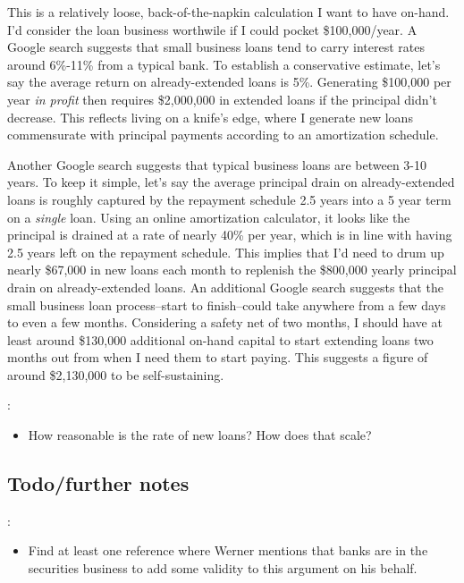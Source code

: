This is a relatively loose, back-of-the-napkin calculation I want to have on-hand.  I'd consider the loan business worthwile if I could pocket \$100,000/year.  A Google search suggests that small business loans tend to carry interest rates around 6\%-11\% from a typical bank.  To establish a conservative estimate, let's say the average return on already-extended loans is 5\%.  Generating \$100,000 per year {\it in profit} then requires \$2,000,000 in extended loans if the principal didn't decrease.  This reflects living on a knife's edge, where I generate new loans commensurate with principal payments according to an amortization schedule.

Another Google search suggests that typical business loans are between 3-10 years.  To keep it simple, let's say the average principal drain on already-extended loans is roughly captured by the repayment schedule 2.5 years into a 5 year term on a {\it single} loan.  Using an online amortization calculator, it looks like the principal is drained at a rate of nearly 40\% per year, which is in line with having 2.5 years left on the repayment schedule.  This implies that I'd need to drum up nearly \$67,000 in new loans each month to replenish the \$800,000 yearly principal drain on already-extended loans.  An additional Google search suggests that the small business loan process--start to finish--could take anywhere from a few days to even a few months.  Considering a safety net of two months, I should have at least around \$130,000 additional on-hand capital to start extending loans two months out from when I need them to start paying.  This suggests a figure of around \$2,130,000 to be self-sustaining.

\note{[Todo]}:
\begin{itemize}
    \item How reasonable is the rate of new loans?  How does that scale?
\end{itemize}


\subsection{Todo/further notes}

\note{[Todo]}:
\begin{itemize}
    \item Find at least one reference where Werner mentions that banks are in the securities business to add some validity to this argument on his behalf.
\end{itemize}